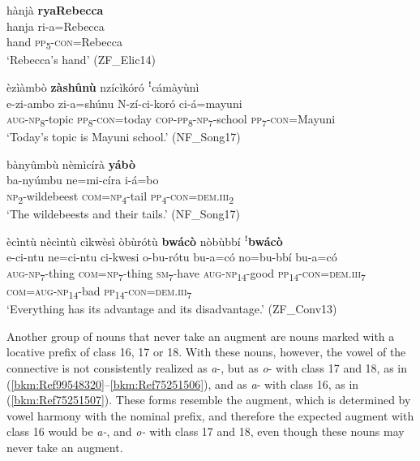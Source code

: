 \ea
\label{bkm:Ref492119044}
hànjà \textbf{ryaRebecca}\\
\gll hanja  ri-a=Rebecca\\
hand  \textsc{pp}\textsubscript{5}-\textsc{con}=Rebecca\\
\glt ‘Rebecca’s hand’ (ZF\_Elic14)
\z

\ea
\label{bkm:Ref491175346}
èzìàmbò \textbf{zàshûnù} nzícìkóró ꜝcámàyùnì\\
\gll e-zi-ambo    zi-a=shúnu    N-zí-ci-koró    ci-á=mayuni\\
\textsc{aug}-\textsc{np}\textsubscript{8}-topic  \textsc{pp}\textsubscript{8}-\textsc{con}=today  \textsc{cop}-\textsc{pp}\textsubscript{8}-\textsc{np}\textsubscript{7}-school  \textsc{pp}\textsubscript{7}-\textsc{con}=Mayuni\\
\glt ‘Today’s topic is Mayuni school.’ (NF\_Song17)
\z

\ea
\label{bkm:Ref71190780}
bànyûmbù nèmìcírà \textbf{yábò}\\
\gll ba-nyúmbu    ne=mi-círa    i-á=bo\\
\textsc{np}\textsubscript{2}-wildebeest  \textsc{com}=\textsc{np}\textsubscript{4}-tail  \textsc{pp}\textsubscript{4}-\textsc{con}=\textsc{dem}.\textsc{iii}\textsubscript{2}\\
\glt ‘The wildebeests and their tails.’ (NF\_Song17)
\z

\ea
\label{bkm:Ref71190782}
ècìntù nècìntù cìkwèsì òbùrótù \textbf{bwácò} nòbùbbí ꜝ\textbf{bwácò}\\
\gll e-ci-ntu    ne=ci-ntu    ci-kwesi  o-bu-rótu                                                                                                                                    bu-a=có    no=bu-bbí      bu-a=có\\
\textsc{aug}-\textsc{np}\textsubscript{7}-thing  \textsc{com}=\textsc{np}\textsubscript{7}-thing  \textsc{sm}\textsubscript{7}-have  \textsc{aug}-\textsc{np}\textsubscript{14}-good \textsc{pp}\textsubscript{14}-\textsc{con}=\textsc{dem}.\textsc{iii}\textsubscript{7}  \textsc{com}=\textsc{aug}-\textsc{np}\textsubscript{14}-bad  \textsc{pp}\textsubscript{14}-\textsc{con}=\textsc{dem}.\textsc{iii}\textsubscript{7}\\
\glt ‘Everything has its advantage and its disadvantage.’ (ZF\_Conv13)
\z

Another group of nouns that never take an augment are nouns marked with a locative prefix of class 16, 17 or 18. With these nouns, however, the vowel of the connective is not consistently realized as \textit{a}-, but as \textit{o}- with class 17 and 18, as in (\ref{bkm:Ref99548320}--\ref{bkm:Ref75251506}), and as \textit{a}- with class 16, as in (\ref{bkm:Ref75251507}). These forms resemble the augment, which is determined by vowel harmony with the nominal prefix, and therefore the expected augment with class 16 would be \textit{a-}, and \textit{o-} with class 17 and 18, even though these nouns may never take an augment.

